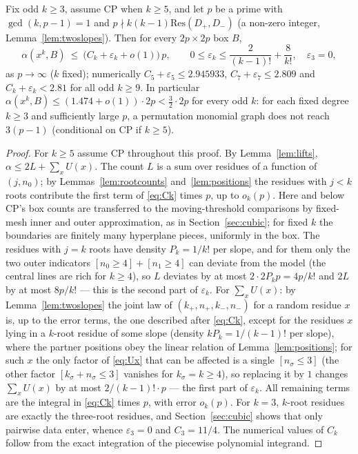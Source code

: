 \begin{theorem}\label{thm:perm}
Fix odd $k\ge3$, assume CP when $k\ge5$, and let $p$ be a prime with $\gcd(k,p-1)=1$ and $p\nmid k(k-1)\mathrm{Res}(D_+,D_-)$ (a non-zero integer, Lemma~\ref{lem:twoslopes}).
Then for every $2p\times2p$ box $B$,
\[
 \alpha(x^k,B)\ \le\ \bigl(C_k+\varepsilon_k+o(1)\bigr)\,p,\qquad 0\le\varepsilon_k\le\frac2{(k-1)!}+\frac8{k!},\quad \varepsilon_3=0,
\]
as $p\to\infty$ ($k$ fixed); numerically $C_5+\varepsilon_5\le2.945933$, $C_7+\varepsilon_7\le2.809$ and $C_k+\varepsilon_k<2.81$ for all odd $k\ge9$.  In particular
$\alpha(x^k,B)\le(1.474+o(1))\cdot2p<\tfrac32\cdot2p$ for every odd $k$: for each fixed degree $k\ge3$ and sufficiently large $p$, a permutation monomial graph does not reach $3(p-1)$ (conditional on CP if $k\ge5$).
\end{theorem}
\begin{proof}
For $k\ge5$ assume CP throughout this proof.  By Lemma~\ref{lem:lifts}, $\alpha\le2L+\sum_xU(x)$.  The count $L$ is a sum over residues of a function of $(j,n_0)$; by Lemmas~\ref{lem:rootcounts}
and~\ref{lem:positions} the residues with $j<k$ roots contribute the first term of \eqref{eq:Ck} times $p$, up to $o_k(p)$.
Here and below CP's box counts are transferred to the moving-threshold comparisons by fixed-mesh inner and outer approximation,
as in Section~\ref{sec:cubic}; for fixed $k$ the boundaries are finitely many hyperplane pieces, uniformly in the box.
The residues
with $j=k$ roots have density $P_k=1/k!$ per slope, and for them only the two outer indicators $[n_0\ge4]+[n_1\ge4]$ can deviate from the model
(the central lines are rich for $k\ge4$), so $L$ deviates by at most $2\cdot2P_kp=4p/k!$ and $2L$ by at most $8p/k!$ — this is the second part of
$\varepsilon_k$.  For $\sum_xU(x)$: by Lemma~\ref{lem:twoslopes} the joint law of $(k_+,n_+,k_-,n_-)$ for a random residue $x$ is, up to the error terms, the
one described after \eqref{eq:Ck}, except for the residues $x$ lying in a $k$-root residue of some slope (density $kP_k=1/(k-1)!$ per slope), where the
partner positions obey the linear relation of Lemma~\ref{lem:positions}; for such $x$ the only factor of \eqref{eq:Ux} that can be affected is a single
$[n_\sigma\le3]$ (the other factor $[k_\sigma+n_\sigma\le3]$ vanishes for $k_\sigma=k\ge4$), so replacing it by $1$ changes $\sum_xU(x)$ by at most
$2/(k-1)!\cdot p$ — the first part of $\varepsilon_k$.  All remaining terms are the integral in \eqref{eq:Ck} times $p$, with error $o_k(p)$.
For $k=3$, $k$-root residues are exactly the three-root residues, and Section~\ref{sec:cubic} shows that only pairwise data enter, whence $\varepsilon_3=0$
and $C_3=11/4$.  The numerical values of $C_k$ follow from the exact integration of the piecewise polynomial integrand.
\end{proof}

